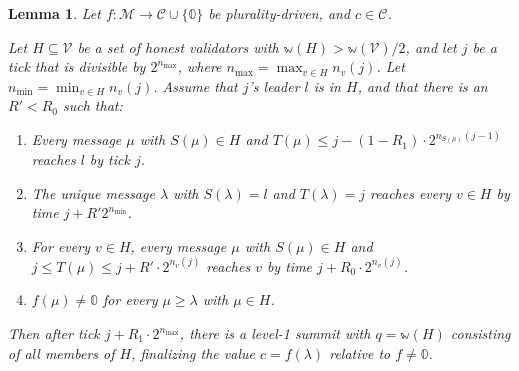 \documentclass[12pt]{article}
\newtheorem{lemma}{Lemma}
\begin{document}
\begin{lemma}\label{basicLiveness}
  Let $f : \mathcal{M} \rightarrow \mathcal{C} \cup \{ \mathbb{0} \}$ be plurality-driven, and $c \in \mathcal{C}$.

  Let $H \subseteq \mathcal{V}$ be a set of honest validators with $\mathbb{w}(H) > \mathbb{w}(\mathcal{V}) / 2$, and let $j$ be a tick that is divisible by $2^{n_{\max}}$, where $n_{\max} = \max_{v \in H} n_v(j)$. Let $n_{\min} = \min_{v \in H} n_v(j)$. Assume that $j$'s leader $l$ is in $H$, and that there is an $R' < R_0$ such that:
  \begin{enumerate}
    \item Every message $\mu$ with $S(\mu) \in H$ and $T(\mu) \leq j - (1 - R_1) \cdot 2^{n_{S(\mu)}(j - 1)}$ reaches $l$ by tick $j$.
    \item The unique message $\lambda$ with $S(\lambda) = l$ and $T(\lambda) = j$ reaches every $v \in H$ by time $j + R' 2^{n_{\min}}$.
    \item For every $v \in H$, every message $\mu$ with $S(\mu) \in H$ and $j \leq T(\mu) \leq j + R' \cdot 2^{n_v(j)}$ reaches $v$ by time $j + R_0 \cdot 2^{n_v(j)}$.
    \item $f(\mu) \neq \mathbb{0}$ for every $\mu \geq \lambda$ with $\mu \in H$.
  \end{enumerate}
  Then after tick $j + R_1 \cdot 2^{n_{\max}}$, there is a level-1 summit with $q = \mathbb{w}(H)$ consisting of all members of $H$, finalizing the value $c = f(\lambda)$ relative to $f \neq \mathbb{0}$.
\end{lemma}
\end{document}
